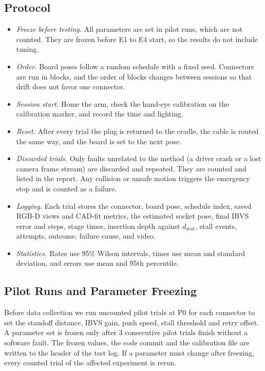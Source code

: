 \documentclass[11pt,conference]{IEEEtran}
\begin{document}
\subsection{Protocol}

\begin{itemize}
\item \emph{Freeze before testing.} All parameters are set in pilot runs, which are not counted. They are frozen before E1 to E4 start, so the results do not include tuning.
\item \emph{Order.} Board poses follow a random schedule with a fixed seed. Connectors are run in blocks, and the order of blocks changes between sessions so that drift does not favor one connector.
\item \emph{Session start.} Home the arm, check the hand-eye calibration on the calibration marker, and record the time and lighting.
\item \emph{Reset.} After every trial the plug is returned to the cradle, the cable is routed the same way, and the board is set to the next pose.
\item \emph{Discarded trials.} Only faults unrelated to the method (a driver crash or a lost camera frame stream) are discarded and repeated. They are counted and listed in the report. Any collision or unsafe motion triggers the emergency stop and is counted as a failure.
\item \emph{Logging.} Each trial stores the connector, board pose, schedule index, saved RGB-D views and CAD-fit metrics, the estimated socket pose, final IBVS error and steps, stage times, insertion depth against $d_{\mathrm{seat}}$, stall events, attempts, outcome, failure cause, and video.
\item \emph{Statistics.} Rates use 95\% Wilson intervals, times use mean and standard deviation, and errors use mean and 95th percentile.
\end{itemize}

\subsection{Pilot Runs and Parameter Freezing}
Before data collection we run uncounted pilot trials at P0 for each connector to set the standoff distance, IBVS gain, push speed, stall threshold and retry offset. A parameter set is frozen only after 3 consecutive pilot trials finish without a software fault. The frozen values, the code commit and the calibration file are written to the header of the test log. If a parameter must change after freezing, every counted trial of the affected experiment is rerun.
\end{document}
